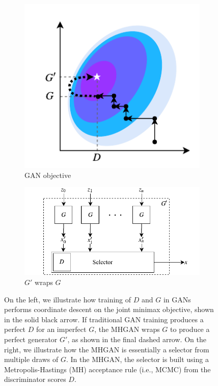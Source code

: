 \documentclass{article}
\begin{document}
\begin{figure}[bhtp]
    \centering
    \begin{subfigure}[t]{2.25in}
       \centering
       \includegraphics[scale=1.0]{figures/coord_descent.pdf}
       \caption{GAN objective}
    \end{subfigure}
    \hfill
    \begin{subfigure}[t]{3in}
       \centering
       \includegraphics[scale=1.0]{figures/block_diag.pdf}
       \caption{$G'$ wraps $G$}
    \end{subfigure}
    \caption{{\small
    On the left, we illustrate how training of $D$ and $G$ in GANs performs coordinate descent on the joint minimax objective, shown in the solid black arrow.
    If traditional GAN training produces a perfect $D$ for an imperfect $G$, the MHGAN wraps $G$ to produce a perfect generator $G'$, as shown in the final dashed arrow.
    On the right, we illustrate how the MHGAN is essentially a selector from multiple draws of $G$.
    In the MHGAN, the selector is built using a Metropolis-Hastings (MH) acceptance rule (i.e., MCMC) from the discriminator scores $D$.
    }}
    \label{fig:block_diag}
\end{figure}
\end{document}
